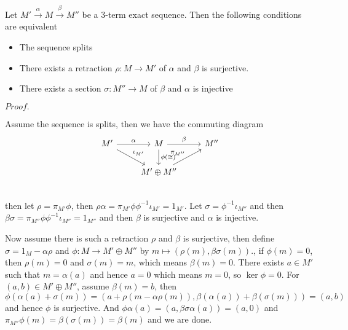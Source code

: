\documentclass{article}
\newcommand{\Pf}[1]{$Proof.$\par}
\begin{document}
\begin{proposition}
    Let $M'\overset{\alpha}{\to}M\overset{\beta}{\to}M''$ be a $3$-term exact sequence. Then the following conditions are equivalent
    \begin{itemize}
        \item The sequence splits
        \item There exists a retraction $\rho:M\to M'$ of $\alpha$ and $\beta$ is surjective.
        \item There exists a section $\sigma:M'' \to M$ of $\beta$ and $\alpha$ is injective
    \end{itemize}
\end{proposition}
\Pf\par
    Assume the sequence is splits, then we have the commuting diagram
    \[
    \begin{tikzcd}
        M'\arrow[r,"\alpha"]\arrow[rd,"\iota_{M'}"] & M\arrow[r,"\beta"]\arrow[d,"\phi(\cong)"] & M'' \\
        & M'\oplus M''\arrow[ru,"\pi_{M''}"] & \\
    \end{tikzcd}
    \]
    then let $\rho = \pi_{M'}\phi$, then $\rho\alpha = \pi_{M'}\phi \phi^{-1}\iota_{M'} = 1_{M'}$. Let $\sigma = \phi^{-1}\iota_{M''}$ and then $\beta\sigma = \pi_{M''}\phi\phi^{-1}\iota_{M''} = 1_{M''}$ and then $\beta$ is surjective and $\alpha$ is injective.\par
    Now assume there is such a retraction $\rho$ and $\beta$ is surjective, then define $\sigma = 1_M - \alpha\rho$ and $\phi: M \to M'\oplus M''$ by $m\mapsto (\rho(m),\beta\sigma(m))$., if $\phi(m) = 0$, then $\rho(m) = 0$ and $\sigma(m) = m$, which means $\beta(m) = 0$. There exists $a\in M'$ such that $m = \alpha(a)$ and hence $a = 0$ which means $m = 0$, so $\ker\phi = 0$. For $(a,b)\in M'\oplus M''$, assume $\beta(m) = b$, then $\phi(\alpha(a) + \sigma(m)) = (a+\rho(m-\alpha\rho(m)), \beta(\alpha(a)) + \beta(\sigma(m))) = (a,b)$ and hence $\phi$ is surjective. And $\phi\alpha(a) = (a,\beta\sigma\alpha(a)) = (a,0)$ and $\pi_{M''}\phi(m) = \beta(\sigma(m)) = \beta(m)$ and we are done.\par
\end{document}
